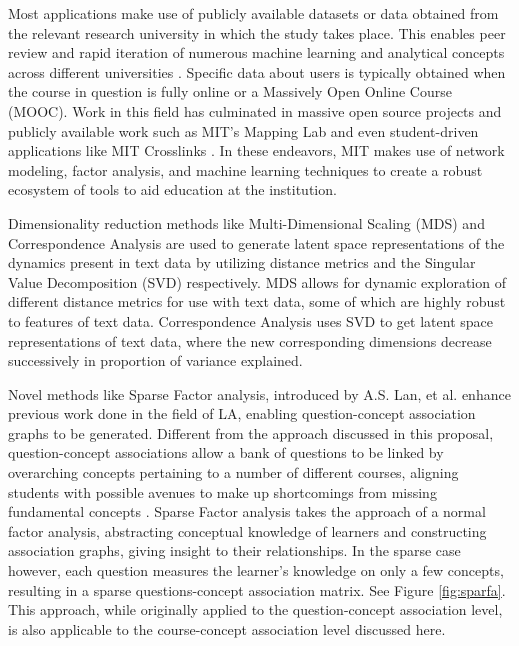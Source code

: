 \documentclass[11pt]{report}
\begin{document}
\indent Most applications make use of publicly available datasets \citep{romero_educational_2020} or data obtained from the relevant research university in which the study takes place. This enables peer review and rapid iteration of numerous machine learning and analytical concepts across different universities \citep{barbu_data_nodate}\citep{romero_educational_2020}\citep{hilliger_evaluating_2019}.  Specific data about users is typically obtained when the course in question is fully online or a Massively Open Online Course (MOOC). Work in this field has culminated in massive open source projects and publicly available work such as MIT’s Mapping Lab and even student-driven applications like MIT Crosslinks \citep{willcox_network_2017}. In these endeavors, MIT makes use of network modeling,  factor analysis, and machine learning techniques to create a robust ecosystem of tools to aid education at the institution. 

Dimensionality reduction methods like Multi-Dimensional Scaling (MDS) \citep{jjs} and Correspondence Analysis are used to generate latent space representations of the dynamics present in text data by utilizing distance metrics and the Singular Value Decomposition (SVD) respectively.  MDS allows for dynamic exploration of different distance metrics for use with text data, some of which are highly robust to features of text data.  Correspondence Analysis uses SVD to get latent space representations of text data,  where the new corresponding dimensions decrease successively in proportion of variance explained. 

\indent Novel methods like Sparse Factor analysis, introduced by A.S. Lan, et al. enhance previous work done in the field of LA, enabling question-concept association graphs to be generated. Different from the approach discussed in this proposal, question-concept associations allow a bank of questions to be linked by overarching concepts pertaining to a number of different courses, aligning students with possible avenues to make up shortcomings from missing fundamental concepts \citep{lan_sparse_nodate}\citep{willcox_network_2017}. Sparse Factor analysis takes the approach of a normal factor analysis, abstracting conceptual knowledge of learners and constructing association graphs, giving insight to their relationships. In the sparse case however, each question measures the learner’s knowledge on only a few concepts, resulting in a sparse questions-concept association matrix.  See Figure \ref{fig:sparfa}. This approach, while originally applied to the question-concept association level, is also applicable to the course-concept association level discussed here. 
\end{document}
